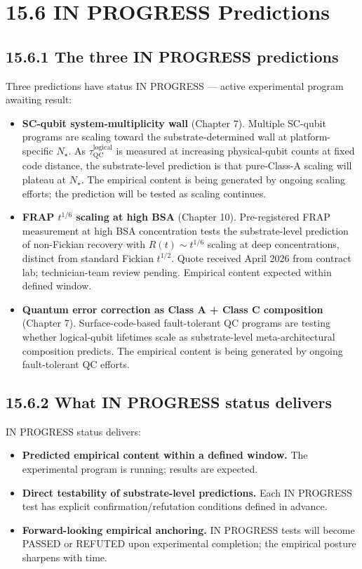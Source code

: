 \documentclass[11pt]{book}
\begin{document}
\section{15.6 IN PROGRESS Predictions}

\subsection{15.6.1 The three IN PROGRESS predictions}

Three predictions have status IN PROGRESS — active experimental program awaiting result:

\begin{itemize}
\item \textbf{SC-qubit system-multiplicity wall} (Chapter 7). Multiple SC-qubit programs are scaling toward the substrate-determined wall at platform-specific $N_\star$. As $\tau_\mathrm{QC}^\mathrm{logical}$ is measured at increasing physical-qubit counts at fixed code distance, the substrate-level prediction is that pure-Class-A scaling will plateau at $N_\star$. The empirical content is being generated by ongoing scaling efforts; the prediction will be tested as scaling continues.
\item \textbf{FRAP $t^{1/6}$ scaling at high BSA} (Chapter 10). Pre-registered FRAP measurement at high BSA concentration tests the substrate-level prediction of non-Fickian recovery with $R(t) \sim t^{1/6}$ scaling at deep concentrations, distinct from standard Fickian $t^{1/2}$. Quote received April 2026 from contract lab; technician-team review pending. Empirical content expected within defined window.
\item \textbf{Quantum error correction as Class A + Class C composition} (Chapter 7). Surface-code-based fault-tolerant QC programs are testing whether logical-qubit lifetimes scale as substrate-level meta-architectural composition predicts. The empirical content is being generated by ongoing fault-tolerant QC efforts.
\end{itemize}

\subsection{15.6.2 What IN PROGRESS status delivers}

IN PROGRESS status delivers:
\begin{itemize}
\item \textbf{Predicted empirical content within a defined window.} The experimental program is running; results are expected.
\item \textbf{Direct testability of substrate-level predictions.} Each IN PROGRESS test has explicit confirmation/refutation conditions defined in advance.
\item \textbf{Forward-looking empirical anchoring.} IN PROGRESS tests will become PASSED or REFUTED upon experimental completion; the empirical posture sharpens with time.
\end{itemize}
\end{document}
